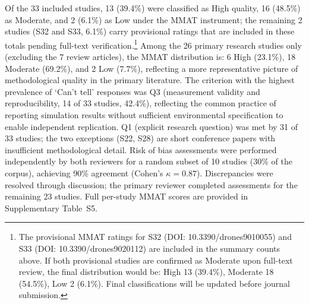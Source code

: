 \documentclass[review,3p,times]{elsarticle}
\begin{document}
Of the 33 included studies, 13 (39.4\%) were classified as High quality, 16 (48.5\%) as Moderate, and 2 (6.1\%) as Low under the MMAT instrument; the remaining 2 studies (S32 and S33, 6.1\%) carry provisional ratings that are included in these totals pending full-text verification.\footnote{The provisional MMAT ratings for S32 (DOI: 10.3390/drones9010055) and S33 (DOI: 10.3390/drones9020112) are included in the summary counts above. If both provisional studies are confirmed as Moderate upon full-text review, the final distribution would be: High 13 (39.4\%), Moderate 18 (54.5\%), Low 2 (6.1\%). Final classifications will be updated before journal submission.} Among the 26 primary research studies only (excluding the 7 review articles), the MMAT distribution is: 6 High (23.1\%), 18 Moderate (69.2\%), and 2 Low (7.7\%), reflecting a more representative picture of methodological quality in the primary literature. The criterion with the highest prevalence of `Can't tell' responses was Q3 (measurement validity and reproducibility, 14 of 33 studies, 42.4\%), reflecting the common practice of reporting simulation results without sufficient environmental specification to enable independent replication. Q1 (explicit research question) was met by 31 of 33 studies; the two exceptions (S22, S28) are short conference papers with insufficient methodological detail. Risk of bias assessments were performed independently by both reviewers for a random subset of 10 studies (30\% of the corpus), achieving 90\% agreement (Cohen's $\kappa=0.87$). Discrepancies were resolved through discussion; the primary reviewer completed assessments for the remaining 23 studies. Full per-study MMAT scores are provided in Supplementary Table~S5.
\end{document}
